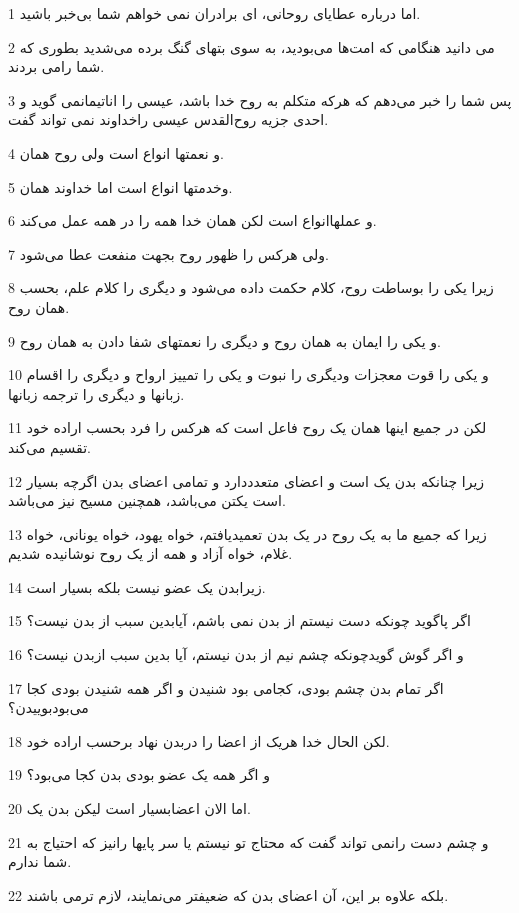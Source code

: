 \par 1 اما درباره عطایای روحانی، ای برادران نمی خواهم شما بی‌خبر باشید.
\par 2 می دانید هنگامی که امت‌ها می‌بودید، به سوی بتهای گنگ برده می‌شدید بطوری که شما رامی بردند.
\par 3 پس شما را خبر می‌دهم که هرکه متکلم به روح خدا باشد، عیسی را اناتیمانمی گوید و احدی جزیه روح‌القدس عیسی راخداوند نمی تواند گفت.
\par 4 و نعمتها انواع است ولی روح همان.
\par 5 وخدمتها انواع است اما خداوند همان.
\par 6 و عملهاانواع است لکن همان خدا همه را در همه عمل می‌کند.
\par 7 ولی هرکس را ظهور روح بجهت منفعت عطا می‌شود.
\par 8 زیرا یکی را بوساطت روح، کلام حکمت داده می‌شود و دیگری را کلام علم، بحسب همان روح.
\par 9 و یکی را ایمان به همان روح و دیگری را نعمتهای شفا دادن به همان روح.
\par 10 و یکی را قوت معجزات ودیگری را نبوت و یکی را تمییز ارواح و دیگری را اقسام زبانها و دیگری را ترجمه زبانها.
\par 11 لکن در جمیع اینها همان یک روح فاعل است که هرکس را فرد بحسب اراده خود تقسیم می‌کند.
\par 12 زیرا چنانکه بدن یک است و اعضای متعدددارد و تمامی اعضای بدن اگرچه بسیار است یکتن می‌باشد، همچنین مسیح نیز می‌باشد.
\par 13 زیرا که جمیع ما به یک روح در یک بدن تعمیدیافتم، خواه یهود، خواه یونانی، خواه غلام، خواه آزاد و همه از یک روح نوشانیده شدیم.
\par 14 زیرابدن یک عضو نیست بلکه بسیار است.
\par 15 اگر پاگوید چونکه دست نیستم از بدن نمی باشم، آیابدین سبب از بدن نیست؟
\par 16 و اگر گوش گویدچونکه چشم نیم از بدن نیستم، آیا بدین سبب ازبدن نیست؟
\par 17 اگر تمام بدن چشم بودی، کجامی بود شنیدن و اگر همه شنیدن بودی کجا می‌بودبوییدن؟
\par 18 لکن الحال خدا هریک از اعضا را دربدن نهاد برحسب اراده خود.
\par 19 و اگر همه یک عضو بودی بدن کجا می‌بود؟
\par 20 اما الان اعضابسیار است لیکن بدن یک.
\par 21 و چشم دست رانمی تواند گفت که محتاج تو نیستم یا سر پایها رانیز که احتیاج به شما ندارم.
\par 22 بلکه علاوه بر این، آن اعضای بدن که ضعیفتر می‌نمایند، لازم ترمی باشند.
